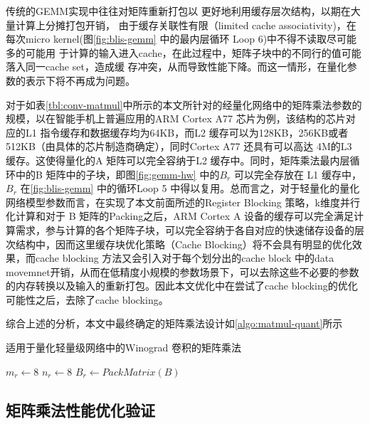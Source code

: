 传统的GEMM实现中往往对矩阵重新打包以 更好地利用缓存层次结构，以期在大量计算上分摊打包开销，
由于缓存关联性有限（limited cache associativity)，在每次micro kernel(图\ref{fig:blis-gemm} 中的最内层循环 Loop 6)中不得不读取尽可能多的可能用
于计算的输入进入cache，在此过程中，矩阵子块中的不同行的值可能落入同一cache set，造成缓
存冲突，从而导致性能下降。而这一情形，在量化参数的表示下将不再成为问题。

对于如表\ref{tbl:conv-matmul}中所示的本文所针对的经量化网络中的矩阵乘法参数的规模，以在智能手机上普遍应用的ARM Cortex A77 芯片为例，该结构的芯片对应的L1 指令缓存和数据缓存均为64KB，而L2 缓存可以为128KB，256KB或者512KB（由具体的芯片制造商确定），同时Cortex A77 还具有可以高达 4M的L3 缓存。这使得量化的A 矩阵可以完全容纳于L2 缓存中。同时，矩阵乘法最内层循环中的B 矩阵中的子块，即图\ref{fig:gemm-hw} 中的$B_r$ 可以完全存放在 L1 缓存中，$B_r$ 在\ref{fig:blis-gemm} 中的循环Loop 5 中得以复用。总而言之，对于轻量化的量化网络模型参数而言，在实现了本文前面所述的Register Blocking 策略，k维度并行化计算和对于 B 矩阵的Packing之后，ARM Cortex A 设备的缓存可以完全满足计算需求，参与计算的各个矩阵子块，可以完全容纳于各自对应的快速储存设备的层次结构中，因而这里缓存块优化策略（Cache Blocking）将不会具有明显的优化效果，而cache blocking 方法又会引入对于每个划分出的cache block 中的data movemnet开销，从而在低精度小规模的参数场景下，可以去除这些不必要的参数的内存转换以及输入的重新打包。因此本文优化中在尝试了cache blocking的优化可能性之后，去除了cache blocking。

综合上述的分析，本文中最终确定的矩阵乘法设计如\ref{algo:matmul-quant}所示

\begin{algorithm}
  \caption{适用于量化轻量级网络中的Winograd 卷积的矩阵乘法}
  $m_r \gets 8 $ 
  $n_r \gets 8 $ 
  $B_r \gets PackMatrix(B)$ 
  \label{algo:matmul-quant}
\end{algorithm}

\subsection{矩阵乘法性能优化验证}

